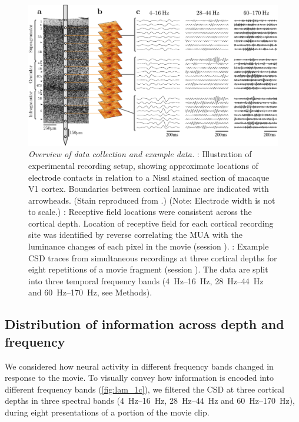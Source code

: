 \begin{figure}[htbp]
\subfloat{\label{fig:lam_1a}}
\subfloat{\label{fig:lam_1b}}
\subfloat{\label{fig:lam_1c}}
\centering \includegraphics[width=\columnwidth]{paperfigs/fig1.pdf}
%
\caption{%
\textit{Overview of data collection and example data.}
\protect{}: Illustration of experimental recording setup, showing approximate locations of electrode contacts in relation to a Nissl stained section of macaque \ac{V1} cortex.
Boundaries between cortical laminae are indicated with arrowheads.
(Stain reproduced from \citet{Tyler1998}.)
(Note: Electrode width is not to scale.)
\protect{}: Receptive field locations were consistent across the cortical depth.
Location of receptive field for each cortical recording site was identified by reverse correlating the \ac{MUA} with the luminance changes of each pixel in the movie (session ).
\protect{}: Example \ac{CSD} traces from simultaneous recordings at three cortical depths for eight repetitions of a movie fragment (session ).
The data are split into three temporal frequency bands (\SIrange{4}{16}{Hz}, \SIrange{28}{44}{Hz} and \SIrange{60}{170}{Hz}, see Methods).
}%
\label{fig:lam_1}
%
\end{figure}


\subsection{Distribution of information across depth and frequency}

We considered how neural activity in different frequency bands changed in response to the movie.
To visually convey how information is encoded into different frequency bands (\autoref{fig:lam_1c}), we filtered the \ac{CSD} at three cortical depths in three spectral bands (\SIrange{4}{16}{Hz}, \SIrange{28}{44}{Hz} and \SIrange{60}{170}{Hz}), during eight presentations of a portion of the movie clip.


